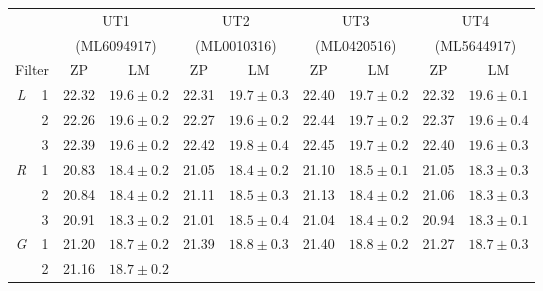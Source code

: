 \begin{colsection}
\begin{colsection}
\newpage

\begin{table}[p]
    \begin{center}
        \begin{tabular}{cc|cc|cc|cc|cc} %
             & &
            \multicolumn{2}{c|}{UT1} &
            \multicolumn{2}{c|}{UT2} &
            \multicolumn{2}{c|}{UT3} &
            \multicolumn{2}{c}{UT4}
            \\
             & &
            \multicolumn{2}{c|}{{\footnotesize(ML6094917)}} &
            \multicolumn{2}{c|}{{\footnotesize(ML0010316)}} &
            \multicolumn{2}{c|}{{\footnotesize(ML0420516)}} &
            \multicolumn{2}{c}{{\footnotesize(ML5644917)}}
            \\
            \multicolumn{2}{c|}{Filter} &
            ZP & LM & ZP & LM & ZP & LM & ZP & LM \\
            \midrule
            \textit{L} & 1 &
            22.32 & $19.6 \pm 0.2$ &
            22.31 & $19.7 \pm 0.3$ &
            22.40 & $19.7 \pm 0.2$ &
            22.32 & $19.6 \pm 0.1$
            \\
            & 2 &
            22.26 & $19.6 \pm 0.2$ &
            22.27 & $19.6 \pm 0.2$ &
            22.44 & $19.7 \pm 0.2$ &
            22.37 & $19.6 \pm 0.4$
            \\
            & 3 &
            22.39 & $19.6 \pm 0.2$ &
            22.42 & $19.8 \pm 0.4$ &
            22.45 & $19.7 \pm 0.2$ &
            22.40 & $19.6 \pm 0.3$
            \\
            \midrule
            \textit{R} & 1 &
            20.83 & $18.4 \pm 0.2$ &
            21.05 & $18.4 \pm 0.2$ &
            21.10 & $18.5 \pm 0.1$ &
            21.05 & $18.3 \pm 0.3$
            \\
            & 2 &
            20.84 & $18.4 \pm 0.2$ &
            21.11 & $18.5 \pm 0.3$ &
            21.13 & $18.4 \pm 0.2$ &
            21.06 & $18.3 \pm 0.3$
            \\
            & 3 &
            20.91 & $18.3 \pm 0.2$ &
            21.01 & $18.5 \pm 0.4$ &
            21.04 & $18.4 \pm 0.2$ &
            20.94 & $18.3 \pm 0.1$
            \\
            \midrule
            \textit{G} & 1 &
            21.20 & $18.7 \pm 0.2$ &
            21.39 & $18.8 \pm 0.3$ &
            21.40 & $18.8 \pm 0.2$ &
            21.27 & $18.7 \pm 0.3$
            \\
            & 2 &
            21.16 & $18.7 \pm 0.2$ &

\end{tabular}
\end{center}
\end{table}
\end{colsection}
\end{colsection}
